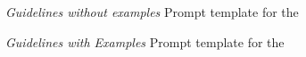 \begin{figure}[h]
    \centering
    \caption{\textit{Guidelines without examples} Prompt template for the \judgemodels}
    \label{app:GuidelinesWithoutExamples}
\end{figure}


\begin{figure}[ht]
    \centering
    \caption{\textit{Guidelines with Examples} Prompt template for the \judgemodels}
    \label{app:GuidelinesWithExamples}
\end{figure}

